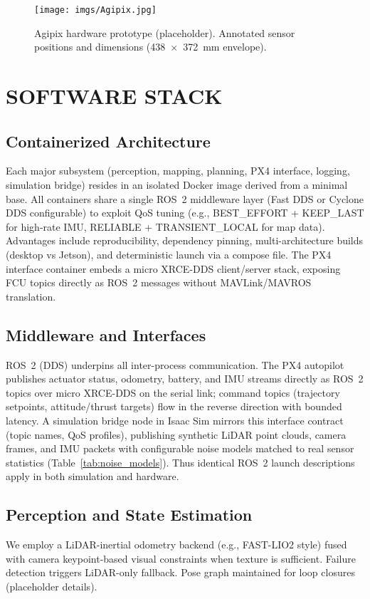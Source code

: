 \documentclass[letterpaper, 10 pt, conference]{ieeeconf}  %
\begin{document}
\begin{figure}[t]
        \centering
        \texttt{[image: imgs/Agipix.jpg]}
        \caption{Agipix hardware prototype (placeholder). Annotated sensor positions and dimensions (438~\(\times\)~372~mm envelope).}
        \label{fig:platform_overview}
\end{figure}

\section{SOFTWARE STACK}
\subsection{Containerized Architecture}
Each major subsystem (perception, mapping, planning, PX4 interface, logging, simulation bridge) resides in an isolated Docker image derived from a minimal base. All containers share a single ROS~2 middleware layer (Fast DDS or Cyclone DDS configurable) to exploit QoS tuning (e.g., BEST\_EFFORT + KEEP\_LAST for high-rate IMU, RELIABLE + TRANSIENT\_LOCAL for map data). Advantages include reproducibility, dependency pinning, multi-architecture builds (desktop vs Jetson), and deterministic launch via a compose file. The PX4 interface container embeds a micro XRCE-DDS client/server stack, exposing FCU topics directly as ROS~2 messages without MAVLink/MAVROS translation.
\subsection{Middleware and Interfaces}
ROS~2 (DDS) underpins all inter-process communication. The PX4 autopilot publishes actuator status, odometry, battery, and IMU streams directly as ROS~2 topics over micro XRCE-DDS on the serial link; command topics (trajectory setpoints, attitude/thrust targets) flow in the reverse direction with bounded latency. A simulation bridge node in Isaac Sim mirrors this interface contract (topic names, QoS profiles), publishing synthetic LiDAR point clouds, camera frames, and IMU packets with configurable noise models matched to real sensor statistics (Table~\ref{tab:noise_models}). Thus identical ROS~2 launch descriptions apply in both simulation and hardware.
\subsection{Perception and State Estimation}
We employ a LiDAR-inertial odometry backend (e.g., FAST-LIO2 style) fused with camera keypoint-based visual constraints when texture is sufficient. Failure detection triggers LiDAR-only fallback. Pose graph maintained for loop closures (placeholder details).
\end{document}
